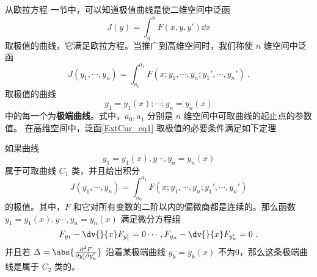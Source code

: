 

从欧拉方程 一节中，可以知道极值曲线是使二维空间中泛函 
\begin{equation}
J(y)=\int_a^b F(x,y,y')\dd x
\end{equation}
取极值的曲线，它满足欧拉方程。当推广到高维空间时，我们称使 $n$ 维空间中泛函 
\begin{equation}\label{ExtCur_eq1}
J(y_1,\cdots, y_n)=\int_{a_0}^{a_1}F(x;y_1,\cdots,y_n;y_1',\cdots,y_n') ~.
\end{equation}
取极值的曲线 
\begin{equation}
y_1=y_1(x);\cdots;y_n=y_n(x)
\end{equation}
中的每一个为\textbf{极端曲线}。式中，$a_0,a_1$ 分别是 $n$ 维空间中可取曲线的起止点的参数值。 
在高维空间中，泛函\autoref{ExtCur_eq1} 取极值的必要条件满足如下定理
\begin{theorem}{}
如果曲线 
\begin{equation}
y_1=y_1(x),y\cdots,y_n=y_n(x)
\end{equation}
属于可取曲线 $C_1$ 类，并且给出积分 
\begin{equation}
J(y_1,\cdots, y_n)=\int_{a_0}^{a_1}F(x;y_1,\cdots,y_n;y_1',\cdots,y_n') 
\end{equation}
 的极值。其中，$F$ 和它对所有变数的二阶以内的偏微商都是连续的。那么函数 $y_1=y_1(x),y\cdots,y_n=y_n(x)$ 满足微分方程组
\begin{equation}
F_{y_1}-\dv{}{x}F_{y_1'}=0\cdots, F_{y_n}-\dv{}{x}F_{y_n'}=0~.
\end{equation}
并且若 $\Delta=\abs{\frac{\partial^2 F}{\partial y_i'\partial y_k'}}$ 沿着某极端曲线 $y_k=y_k(x)$ 不为0，那么这条极端曲线是属于 $C_2$ 类的。
\end{theorem}
